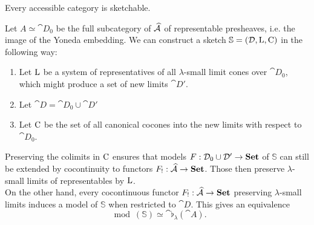 \begin{Theorem}
Every accessible category is sketchable.
\end{Theorem}
\begin{Proof}
Let $A \simeq \cat D_0$ be the full subcategory of $\widehat{\mathcal{A}}$ of representable presheaves, i.e. the image of the Yoneda embedding. We can construct a sketch $\mathbb S = (\mathcal{D}, \textrm{L}, \textrm{C})$ in the following way:

\begin{enumerate}
\item Let $\textrm{L}$ be a system of representatives of all $\lambda$-small limit cones over $\cat D_0$, which might produce a set of new limits $\cat D'$.
\item Let $\cat D = \cat D_0 \cup \cat D'$
\item Let $\textrm{C}$ be the set of all canonical cocones into the new limits with respect to $\cat D_0$.
\end{enumerate}

Preserving the colimits in $\textrm{C}$ ensures that models $F : \mathcal{D}_0 \cup \mathcal{D}' \to \mathbf{Set}$ of $\mathbb S$ can still be extended by cocontinuity to functors $F_! : \widehat{\mathcal{A}} \to \mathbf{Set}$. Those then preserve $\lambda$-small limits of representables by $\textrm{L}$. \\

On the other hand, every cocontinuous functor $F_! : \widehat{\mathcal{A}} \to \mathbf{Set}$ preserving $\lambda$-small limits induces a model of $\mathbb S$ when restricted to $\cat D$. This gives an equivalence
\[ \mod(\mathbb S) \simeq \cat \flat_\lambda(\cat A). \]
\end{Proof}

